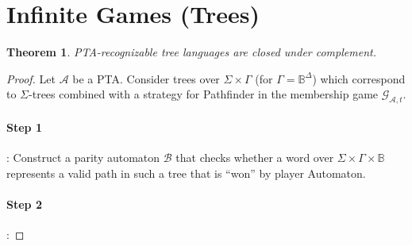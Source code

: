 \documentclass{article}
\newtheorem{theorem}{Theorem}
\begin{document}
\section{Infinite Games (Trees)}
\begin{theorem}
\label{pta_complement}
	PTA-recognizable tree languages are closed under complement.
\end{theorem}
\begin{proof} Let $\mathcal{A}$ be a PTA. Consider trees over $\Sigma \times \Gamma$ (for $\Gamma = \mathbb{B}^\Delta$) which correspond to $\Sigma$-trees combined with a strategy for Pathfinder in the membership game $\mathcal{G}_{\mathcal{A},t}$.
	\paragraph{Step 1}: Construct a parity automaton $\mathcal{B}$ that checks whether a word over $\Sigma \times \Gamma \times \mathbb{B}$ represents a valid path in such a tree that is ``won'' by player Automaton. %
	
	\paragraph{Step 2}: 
\end{proof}
\end{document}
